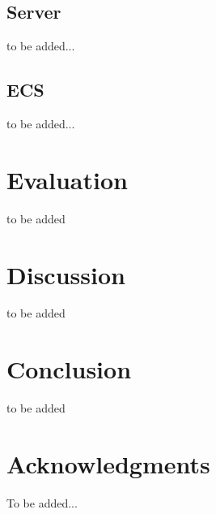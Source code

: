 \documentclass{sig-alternate}
\begin{document}
\subsection{Server}\label{serverimpl}
to be added...
\subsection{ECS}
to be added...
\section{Evaluation}
to be added
\section{Discussion}
to be added
\section{Conclusion}
to be added

\section{Acknowledgments}
To be added...
%

%
%

\end{document}
